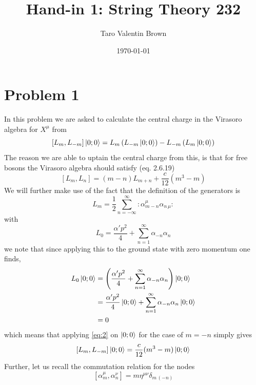 \documentclass[a4paper,10pt]{article}
\date{\today}
\renewcommand\[{\begin{equation*}}
\renewcommand\]{\end{equation*}}
\numberwithin{equation}{section}
\begin{document}
\title{\textbf{Hand-in 1: String Theory 232}}
\author{Taro Valentin Brown }
\maketitle
\section*{Problem 1}
In this problem we are asked to calculate the central charge in the Virasoro algebra for $X^\mu$ from
\begin{equation} \label{eq:1}
    [L_m, L_{-m}]\ket{0;0}=L_m\left(L_{-m}\ket{0;0}\right)-L_{-m}\left(L_{m}\ket{0;0}\right)
\end{equation}
The reason we are able to uptain the central charge from this, is that for free bosons the Virasoro algebra should satisfy (eq. 2.6.19)
\begin{equation} \label{eq:2}
    [L_m, L_{n}]=(m-n)L_{m+n}+\frac{c}{12}(m^3-m)
\end{equation}
We will further make use of the fact that the definition of the generators is
\begin{equation}
    L_m=\frac{1}{2}\sum_{n=-\infty}^{\infty}:
    \alpha^{\mu}_{m-n}\alpha_{n\,\mu}:
\end{equation}
with 
\begin{equation}
    L_0=\frac{\alpha 'p^2}{4}+\sum_{n=1}^{\infty}\alpha_{-n} \alpha_n
\end{equation}
we note that since applying this to the ground state with zero momentum one finds,
\begin{equation} \label{eq:3}
\begin{aligned}
   L_0\ket{0;0}&= \left(\frac{\alpha 'p^2}{4}+\sum_{n=1}^{\infty}\alpha_{-n} \alpha_n\right)\ket{0;0}\\
   &=\frac{\alpha 'p^2}{4}\ket{0;0}+\sum_{n=1}^{\infty}\alpha_{-n} \alpha_n\ket{0;0}\\
   &=0
\end{aligned}
\end{equation}
which means that applying \eqref{eq:2} on $\ket{0;0}$ for the case of $m=-n$ simply gives
\begin{equation}\label{eq:algebra}
    [L_m, L_{-m}]\ket{0;0}=\frac{c}{12}(m^3-m)\ket{0;0}
\end{equation}
Further, let us recall the commutation relation for the nodes
\begin{equation} \label{eq:comm}
    [\alpha_m^\mu,\alpha^\nu_n]=m\eta^{\mu\nu}\delta_{m\,(-n
)}
\end{equation}
\end{document}
